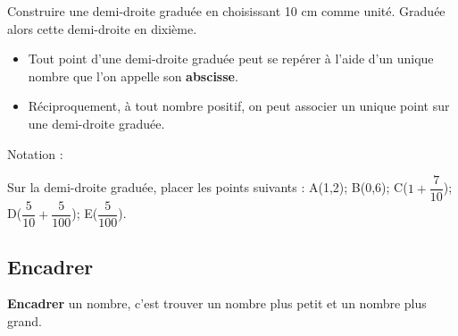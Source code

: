 \documentclass[a4paper]{book}
\begin{document}
    \begin{exemple}
        Construire une demi-droite graduée en choisissant 10 cm comme unité. Graduée alors cette demi-droite en dixième.

        \vspace{1cm}
    \end{exemple}


    \begin{propriete}[Repérer]
        \begin{itemize}
            \item Tout point d'une demi-droite graduée peut se repérer à l'aide d'un unique nombre que l'on appelle son \textbf{abscisse}.

            \item Réciproquement, à tout nombre positif, on peut associer un unique point sur une demi-droite graduée.
        \end{itemize}

        Notation : 
    \end{propriete}


    \begin{exemple}
        Sur la demi-droite graduée, placer les points suivants : A(1,2); B(0,6); C($1+\dfrac{7}{10}$); D($\dfrac{5}{10}+\dfrac{5}{100}$); E($\dfrac{5}{100}$).
    
        \begin{center}
        \end{center}     
    \end{exemple}


\subsection{Encadrer}
    \begin{definition}[Encadrer]
        \textbf{Encadrer} un nombre, c'est trouver un nombre plus petit et un nombre plus grand.
    \end{definition}
\end{document}
